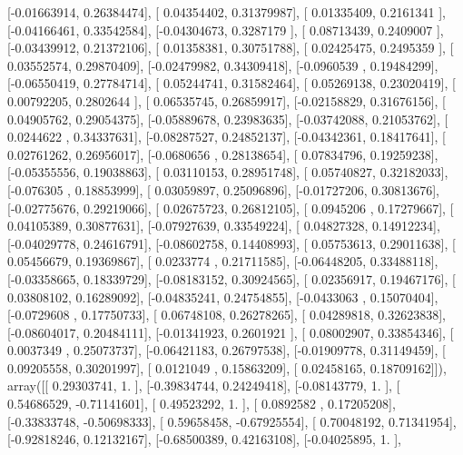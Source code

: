 \documentclass{article}
\begin{document}
       [-0.01663914,  0.26384474],
       [ 0.04354402,  0.31379987],
       [ 0.01335409,  0.2161341 ],
       [-0.04166461,  0.33542584],
       [-0.04304673,  0.3287179 ],
       [ 0.08713439,  0.2409007 ],
       [-0.03439912,  0.21372106],
       [ 0.01358381,  0.30751788],
       [ 0.02425475,  0.2495359 ],
       [ 0.03552574,  0.29870409],
       [-0.02479982,  0.34309418],
       [-0.0960539 ,  0.19484299],
       [-0.06550419,  0.27784714],
       [ 0.05244741,  0.31582464],
       [ 0.05269138,  0.23020419],
       [ 0.00792205,  0.2802644 ],
       [ 0.06535745,  0.26859917],
       [-0.02158829,  0.31676156],
       [ 0.04905762,  0.29054375],
       [-0.05889678,  0.23983635],
       [-0.03742088,  0.21053762],
       [ 0.0244622 ,  0.34337631],
       [-0.08287527,  0.24852137],
       [-0.04342361,  0.18417641],
       [ 0.02761262,  0.26956017],
       [-0.0680656 ,  0.28138654],
       [ 0.07834796,  0.19259238],
       [-0.05355556,  0.19038863],
       [ 0.03110153,  0.28951748],
       [ 0.05740827,  0.32182033],
       [-0.076305  ,  0.18853999],
       [ 0.03059897,  0.25096896],
       [-0.01727206,  0.30813676],
       [-0.02775676,  0.29219066],
       [ 0.02675723,  0.26812105],
       [ 0.0945206 ,  0.17279667],
       [ 0.04105389,  0.30877631],
       [-0.07927639,  0.33549224],
       [ 0.04827328,  0.14912234],
       [-0.04029778,  0.24616791],
       [-0.08602758,  0.14408993],
       [ 0.05753613,  0.29011638],
       [ 0.05456679,  0.19369867],
       [ 0.0233774 ,  0.21711585],
       [-0.06448205,  0.33488118],
       [-0.03358665,  0.18339729],
       [-0.08183152,  0.30924565],
       [ 0.02356917,  0.19467176],
       [ 0.03808102,  0.16289092],
       [-0.04835241,  0.24754855],
       [-0.0433063 ,  0.15070404],
       [-0.0729608 ,  0.17750733],
       [ 0.06748108,  0.26278265],
       [ 0.04289818,  0.32623838],
       [-0.08604017,  0.20484111],
       [-0.01341923,  0.2601921 ],
       [ 0.08002907,  0.33854346],
       [ 0.0037349 ,  0.25073737],
       [-0.06421183,  0.26797538],
       [-0.01909778,  0.31149459],
       [ 0.09205558,  0.30201997],
       [ 0.0121049 ,  0.15863209],
       [ 0.02458165,  0.18709162]]), array([[ 0.29303741,  1.        ],
       [-0.39834744,  0.24249418],
       [-0.08143779,  1.        ],
       [ 0.54686529, -0.71141601],
       [ 0.49523292,  1.        ],
       [ 0.0892582 ,  0.17205208],
       [-0.33833748, -0.50698333],
       [ 0.59658458, -0.67925554],
       [ 0.70048192,  0.71341954],
       [-0.92818246,  0.12132167],
       [-0.68500389,  0.42163108],
       [-0.04025895,  1.        ],
\end{document}
